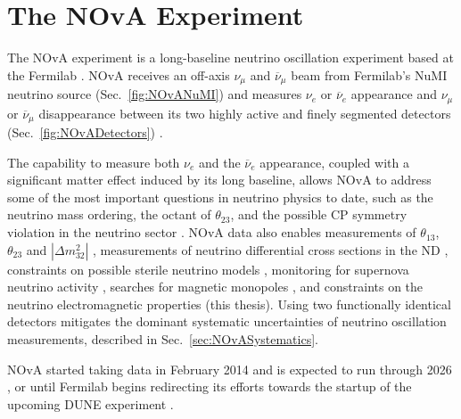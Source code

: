 \chapter{The NOvA Experiment}\label{sec:NOvA}

The \gls{NOvA} \cite{NOvAWebsite} experiment is a long-baseline neutrino oscillation experiment based at the \gls{Fermilab}
\cite{FNALWebsite}. \gls{NOvA} receives an off-axis $\nu_\mu$ and $\overline{\nu}_\mu$ beam from \gls{Fermilab}'s \gls{NuMI} neutrino source (Sec.~\ref{fig:NOvANuMI}) and measures $\nu_e$ or $\overline{\nu}_e$ appearance and $\nu_\mu$ or $\overline{\nu}_\mu$ disappearance between its two highly active and finely segmented detectors (Sec.~\ref{fig:NOvADetectors}) \cite{PhysicsOfNOvA.pdf}. 

The capability to measure both $\nu_e$ and the $\overline{\nu}_e$ appearance, coupled with a significant matter effect induced by its long baseline, allows \gls{NOvA} to address some of the most important questions in neutrino physics to date, such as the neutrino mass ordering, the octant of $\theta_{23}$, and the possible \gls{CP} symmetry violation in the neutrino sector \cite{PhysicsOfNOvA.pdf,NOvAStatusAndOutlook.pdf,FirstNOvAResult.pdf,2019NOvAFHCRHCResults.pdf,NOvAResults2021.pdf}. \gls{NOvA} data also enables measurements of $\theta_{13}$, $\theta_{23}$ and $\left|\Delta m^2_{32}\right|$ \cite{PhysicsOfNOvA.pdf}, measurements of neutrino differential cross sections in the \gls{ND} \cite{NOvANCPi0XSecMeasurement2019.pdf, NOvANumuCCXSexMeasurement2023.pdf, NOvANueCCXSecMeasurement2023.pdf, NOvANuMuCCPi0XSecMeasurement2023.pdf}, constraints on possible sterile neutrino models \cite{NOvASterilesFHCResults2017.pdf, NOvASterilesFHCRHCResults2021.pdf}, monitoring for supernova neutrino activity \cite{NOvASupernovaMeasurements2020.pdf, NOvASupernovaCoincidenceMeasurements2021.pdf}, searches for magnetic monopoles \cite{NOvASlowMagMonopoles2021.pdf}, and constraints on the neutrino electromagnetic properties (this thesis). Using two functionally identical detectors mitigates the dominant systematic uncertainties of neutrino oscillation measurements, described in Sec.~\ref{sec:NOvASystematics}.


\gls{NOvA} started taking data in February 2014 and is expected to run through 2026 \cite{NOvAHalfTimeOverview2022.pdf}, or until \gls{Fermilab} begins redirecting its efforts towards the startup of the upcoming \gls{DUNE} experiment \cite{NOvAPhysicsThrough2025SnowmassLOI.pdf}.

